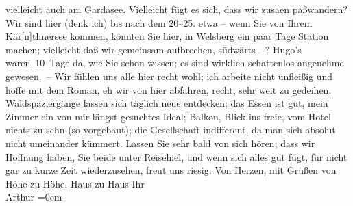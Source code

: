 \begin{ledgroupsized}[t]{13cm}
               vielleicht auch am Gardasee. Vielleicht fügt es
               sich, dass wir zusa{\geminationm}en paßwandern? Wir sind hier (denk
               ich) bis nach dem 20–25. etwa – wenn Sie von Ihrem Kär{[}n{]}thnersee kommen, könnten Sie
               hier, in Welsberg ein paar Tage {\pb}Station machen; vielleicht daß wir gemeinsam
               aufbrechen, südwärts –?\pend
           \pstart
           Hugo’s waren 10 Tage da, wie Sie schon
               wissen; es sind wirklich schattenlos angenehme gewesen. – Wir fühlen uns alle hier
               recht wohl; ich arbeite nicht unfleißig und hoffe mit dem Roman, eh wir von hier abfahren, recht, sehr
               weit zu gedeihen. Waldspaziergänge lassen sich täglich neue entdecken; das Essen ist
               gut, mein Zimmer ein von mir längst gesuchtes Ideal; Balkon, Blick ins freie, vom
               Hotel nichts zu sehn (so vorgebaut); die Gesellschaft indifferent, da man sich
               absolut nicht umeinander kümmert.\pend
           \pstart
           Lassen Sie sehr bald von sich hören; dass wir Hoffnung haben, Sie beide unter
                  Reisehi{\geminationm}el, und wenn sich alles gut fügt, für nicht
               gar zu kurze Zeit wiederzusehen, freut uns riesig.\pend
           \pstart
           Von Herzen, mit Grüßen von Höhe zu Höhe, Haus zu Haus\pend
           \pstart
           Ihr{\\[\baselineskip]}\spacefill\mbox{Arthur}\pend
           \leftskip=0em{}\endnumbering{}\end{ledgroupsized}  \newcommand{\dateiname}{L01695}\newcommand{\titel}{Arthur Schnitzler an Richard Beer-Hofmann, 29. 7. 1907}\newcommand{\editorInnen}{Martin Anton Müller und Gerd-Hermann Susen}
      